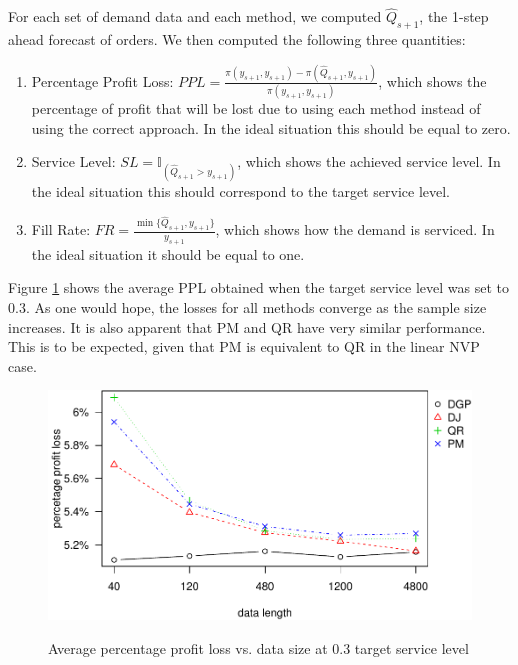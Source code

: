 \documentclass{article}
\begin{document}
For each set of demand data and each method, we computed $\hat{Q}_{s+1}$, the 1-step ahead forecast of orders. We then computed the following three quantities:
\begin{enumerate}
    \item Percentage Profit Loss:  $PPL=\frac{\pi(y_{s+1},y_{s+1})-\pi(\hat{Q}_{s+1},y_{s+1})}{\pi(y_{s+1},y_{s+1})}$, which shows the percentage of profit that will be lost due to using each method instead of using the correct approach. In the ideal situation this should be equal to zero.
    \item Service Level: $SL=\mathbb {I}_{(\hat{Q}_{s+1}>y_{s+1})}$, which shows the achieved service level. In the ideal situation this should correspond to the target service level.
    \item Fill Rate: $FR=\frac{\min\{\hat{Q}_{s+1},y_{s+1}\}}{y_{s+1}}$, which shows how the demand is serviced. In the ideal situation it should be equal to one.
\end{enumerate}

 Figure \ref{fig:ppl0.3} shows the average PPL obtained when the target service level was set to $0.3$. As one would hope, the losses for all methods converge as the sample size increases. It is also apparent that PM and QR have very similar performance. This is to be expected, given that PM is equivalent to QR in the linear NVP case.

\begin{figure}
\centering
\caption{Average percentage profit loss vs. data size at 0.3 target service level}
\includegraphics{linear-norm-plot_files/figure-latex/ppl0.3-1.pdf}
\label{fig:ppl0.3}
\end{figure}
\end{document}
